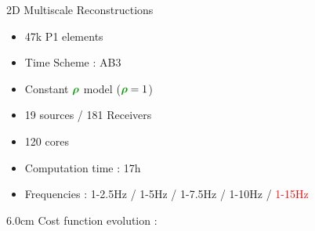 \begin{frame}[noframenumbering]{2D Multiscale Reconstructions}

  \begin{multicols}{2}
    \begin{itemize}
    \item 47k P1 elements
    \item Time Scheme : AB3
    \item Constant $\density$ model ($\density=1$)
    \item 19 sources / 181 Receivers
    \item 120 cores
    \item Computation time : 17h
    \item Frequencies : 1-2.5Hz / 1-5Hz / 1-7.5Hz / 1-10Hz / \textcolor{red}{1-15Hz}
    \end{itemize}
    \columnbreak

    \setlength{\plotwidth} {6.0cm}
    \setlength{\plotheight}{5cm}
    Cost function evolution :
    \begin{figure}
    \end{figure}
  \end{multicols}
\end{frame}



